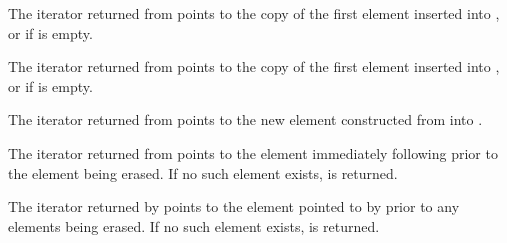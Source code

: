 \documentclass{wg21}
\begin{document}
\begin{addedblock}
\pnum
The iterator returned from  points to the copy of the first
element inserted into , or  if  is empty.

\end{addedblock}

\pnum
The iterator returned from  points to the copy of the first
element inserted into , or  if  is empty.

\pnum
The iterator returned from  points to the new element
constructed from  into .

\pnum
The iterator returned from
points to the element immediately following
prior to the element being erased.
If no such element exists,
is returned.

\pnum
The iterator returned by
points to the element pointed to by
prior to any elements being erased.
If no such element exists,
is returned.
\end{document}
